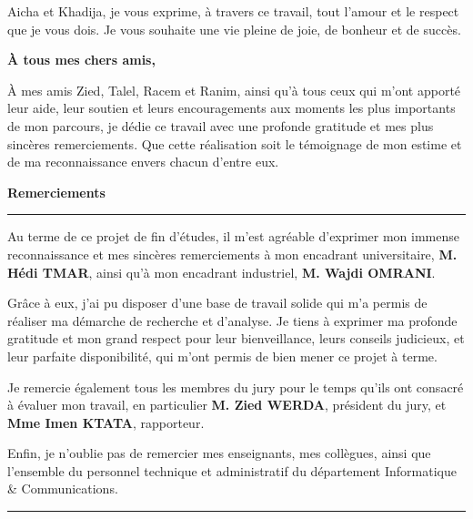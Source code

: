 \begin{center}
\begin{minipage}{0.75\textwidth}
\centering
Aicha et Khadija, je vous exprime, à travers ce travail, tout l'amour et le respect que je vous dois. Je vous souhaite une vie pleine de joie, de bonheur et de succès.
\end{minipage}

\vspace{0.8cm}

{\large\bfseries À tous mes chers amis,}

\vspace{0.4cm}

\begin{minipage}{0.75\textwidth}
\centering
À mes amis Zied, Talel, Racem et Ranim, ainsi qu'à tous ceux qui m'ont apporté leur aide, leur soutien et leurs encouragements aux moments les plus importants de mon parcours, je dédie ce travail avec une profonde gratitude et mes plus sincères remerciements. Que cette réalisation soit le témoignage de mon estime et de ma reconnaissance envers chacun d'entre eux.
\end{minipage}

\vspace{1.5cm}

\end{center}

\newpage
\thispagestyle{empty}

\begin{center}
{\Large\bfseries Remerciements}
\end{center}

\vspace{1cm}

\begin{center}
\rule{0.5\textwidth}{0.4pt}
\end{center}

\vspace{1cm}

\begin{minipage}{0.85\textwidth}
\setlength{\parskip}{0.6em}

Au terme de ce projet de fin d'études, il m'est agréable d'exprimer mon immense reconnaissance et mes sincères remerciements à mon encadrant universitaire, \textbf{M. Hédi TMAR}, ainsi qu'à mon encadrant industriel, \textbf{M. Wajdi OMRANI}.

Grâce à eux, j'ai pu disposer d'une base de travail solide qui m'a permis de réaliser ma démarche de recherche et d'analyse. Je tiens à exprimer ma profonde gratitude et mon grand respect pour leur bienveillance, leurs conseils judicieux, et leur parfaite disponibilité, qui m'ont permis de bien mener ce projet à terme.

Je remercie également tous les membres du jury pour le temps qu'ils ont consacré à évaluer mon travail, en particulier \textbf{M. Zied WERDA}, président du jury, et \textbf{Mme Imen KTATA}, rapporteur.

Enfin, je n'oublie pas de remercier mes enseignants, mes collègues, ainsi que l'ensemble du personnel technique et administratif du département Informatique \& Communications.

\end{minipage}

\vspace{1.5cm}

\begin{center}
\rule{0.5\textwidth}{0.4pt}
\end{center}
